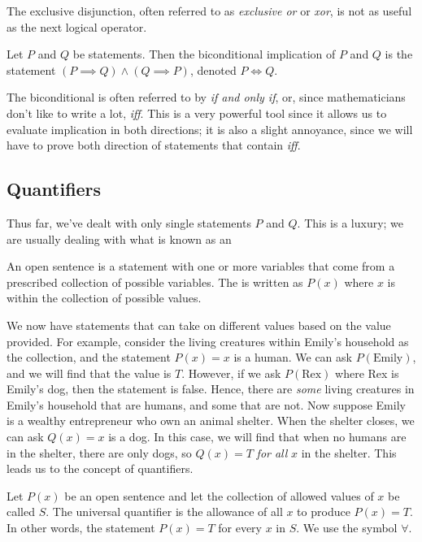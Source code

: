 The exclusive disjunction, often referred to as \textit{exclusive or} or \textit{xor}, is not as useful as the next logical operator.

\begin{definition}{}
	Let $P$ and $Q$ be statements. Then the biconditional implication of $P$ and $Q$ is the statement $(P\implies Q)\land(Q\implies P)$, denoted $P\iff Q$.
\end{definition}

The biconditional is often referred to by \textit{if and only if}, or, since mathematicians don't like to write a lot, \textit{iff}. This is a very powerful tool since it allows us to evaluate implication in both directions; it is also a slight annoyance, since we will have to prove both direction of statements that contain \textit{iff}.

\subsection{Quantifiers}

Thus far, we've dealt with only single statements $P$ and $Q$. This is a luxury; we are usually dealing with what is known as an
\begin{definition}{}
    An open sentence is a statement with one or more variables that come from a prescribed collection of possible variables. The is written as $P(x)$ where $x$ is within the collection of possible values.
\end{definition}
We now have statements that can take on different values based on the value provided. For example, consider the living creatures within Emily's household as the collection, and the statement $P(x)= x$ is a human. We can ask $P(\text{Emily})$, and we will find that the value is $T$. However, if we ask $P(\text{Rex})$ where Rex is Emily's dog, then the statement is false. Hence, there are \textit{some} living creatures in Emily's household that are humans, and some that are not. Now suppose Emily is a wealthy entrepreneur who own an animal shelter. When the shelter closes, we can ask $Q(x)=x$ is a dog. In this case, we will find that when no humans are in the shelter, there are only dogs, so $Q(x)=T$ \textit{for all} $x$ in the shelter. This leads us to the concept of quantifiers.

\begin{definition}{}
    Let $P(x)$ be an open sentence and let the collection of allowed values of $x$ be called $S$. The universal quantifier is the allowance of all $x$ to produce $P(x)=T$. In other words, the statement $P(x)=T$ for every $x$ in $S$. We use the symbol $\forall$.
\end{definition}

